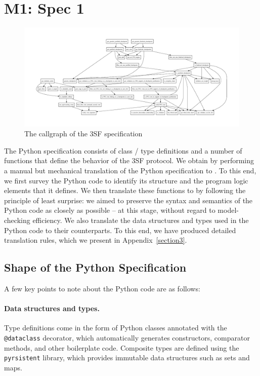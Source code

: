 
\section{M1: Spec 1}

\begin{figure}
    \centering
    \includegraphics[width=.9\textheight,angle=-90]{ffg-callgraph.pdf}
    \caption{The callgraph of the 3SF specification}
    \label{fig:callgraph}
\end{figure}

The Python specification consists of class / type definitions and a number of
functions that define the behavior of the 3SF protocol. We obtain \SpecOne{} by
performing a manual but mechanical translation of the Python specification to
\tlap{}. To this end, we first survey the Python code to identify its structure
and the program logic elements that it defines. We then translate these
functions to \tlap{} by following the principle of least surprise: we aimed to
preserve the syntax and semantics of the Python code as closely as possible --
at this stage, without regard to model-checking efficiency. We also translate
the data structures and types used in the Python code to their \tlap{}
counterparts. To this end, we have produced detailed translation rules, which we
present in Appendix~\ref{section3}.

\subsection{Shape of the Python Specification}

A few key points to note about the Python code are as follows:

\paragraph{Data structures and types.} Type definitions come in the form of
Python classes annotated with the \texttt{@dataclass} decorator, which
automatically generates constructors, comparator methods, and other boilerplate
code. Composite types are defined using the \texttt{pyrsistent} library, which
provides immutable data structures such as sets and maps.

